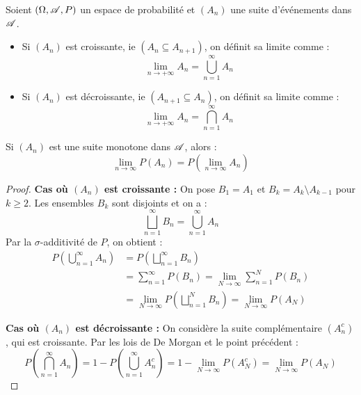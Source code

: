 \begin{definition}
    Soient $(\Omega, \mathscr{A}, P)$ un espace de probabilité et $(A_n)$ une suite d'événements dans $\mathscr{A}$.
    \begin{itemize}
        \item Si $(A_n)$ est croissante, ie $(A_n \subseteq A_{n+1})$, on définit sa limite comme :
        \[
        \lim_{n\to +\infty}A_n = \bigcup_{n=1}^{\infty} A_n
        \]
        \item Si $(A_n)$ est décroissante, ie $(A_{n+1} \subseteq A_n)$, on définit sa limite comme :
        \[
        \lim_{n\to +\infty}A_n = \bigcap_{n=1}^{\infty} A_n
        \]
    \end{itemize}
\end{definition}

\begin{theoreme}
    Si $(A_n)$ est une suite monotone dans $\mathscr{A}$, alors :
    \[
    \lim_{n\to\infty} P(A_n) = P\left(\lim_{n\to\infty}A_n\right)
    \]
\end{theoreme}

\begin{proof}
    \textbf{Cas où $(A_n)$ est croissante :} On pose $B_1 = A_1$ et $B_k = A_k\setminus A_{k-1}$ pour $k \ge 2$. Les ensembles $B_k$ sont disjoints et on a :
    \[
    \bigsqcup_{n=1}^\infty B_n = \bigcup_{n=1}^\infty A_n
    \]
    Par la $\sigma$-additivité de $P$, on obtient :
    \begin{align*}
        P\left( \bigcup_{n=1}^{\infty}A_n\right) &= P\left(\bigsqcup_{n=1}^{\infty}B_n\right)\\
        &= \sum_{n = 1}^\infty P(B_n) = \lim_{N\to\infty} \sum_{n = 1}^N P(B_n)\\
        &= \lim_{N\to\infty} P\left(\bigsqcup_{n = 1}^N B_n\right) = \lim_{N\to\infty}P(A_N)
    \end{align*}
    
    \textbf{Cas où $(A_n)$ est décroissante :} On considère la suite complémentaire $(A^c_n)$, qui est croissante. Par les lois de De Morgan et le point précédent :
    \[
    P\left(\bigcap_{n=1}^\infty A_n\right) = 1 - P\left(\bigcup_{n=1}^\infty A^c_n\right) = 1 - \lim_{N\to\infty}P(A^c_N) = \lim_{N\to\infty} P(A_N)
    \]
\end{proof} 

